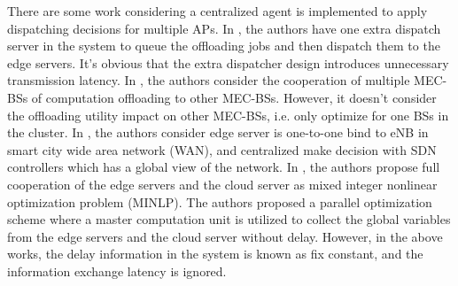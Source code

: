 
There are some work considering a centralized agent is implemented to apply dispatching decisions for multiple APs.
In \cite{IOTJ19-CaoJ}, the authors have one extra dispatch server in the system to queue the offloading jobs and then dispatch them to the edge servers.
It's obvious that the extra dispatcher design introduces unnecessary transmission latency.
In \cite{Fan2017}, the authors consider the cooperation of multiple MEC-BSs of computation offloading to other MEC-BSs. However, it doesn't consider the offloading utility impact on other MEC-BSs, i.e. only optimize for one BSs in the cluster.
In \cite{JSAC19-AlameddineHA}, the authors consider edge server is one-to-one bind to eNB  in smart city wide area network (WAN), and centralized make decision with SDN controllers which has a global view of the network.
In \cite{TVT19-WangY}, the authors propose full cooperation of the edge servers and the cloud server as mixed integer nonlinear optimization problem (MINLP).
The authors proposed a parallel optimization scheme where a master computation unit is utilized to collect the global variables from the edge servers and the cloud server without delay. 
However, in the above works, the delay information in the system is known as fix constant, and the information exchange latency is ignored.


